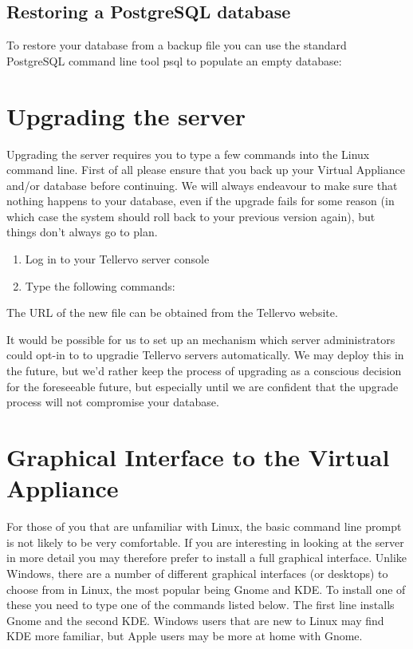 \subsection{Restoring a PostgreSQL database}
To restore your database from a backup file you can use the standard PostgreSQL command line tool psql to populate an empty database:




\section{Upgrading the server}
Upgrading the server requires you to type a few commands into the Linux command line.  First of all please ensure that you back up your Virtual Appliance and/or database before continuing.  We will always endeavour to make sure that nothing happens to your database, even if the upgrade fails for some reason (in which case the system should roll back to your previous version again), but things don't always go to plan.

\begin{enumerate}
 \item Log in to your Tellervo server console 
 \item Type the following commands: 
\end{enumerate}

The URL of the new file can be obtained from the Tellervo website.  

It would be possible for us to set up an mechanism which server administrators could opt-in to to upgradie Tellervo servers automatically.  We may deploy this in the future, but we'd rather keep the process of upgrading as a conscious decision for the foreseeable future, but especially until we are confident that the upgrade process will not compromise your database.


\section{Graphical Interface to the Virtual Appliance}
For those of you that are unfamiliar with Linux, the basic command line prompt is not likely to be very comfortable.  If you are interesting in looking at the server in more detail you may therefore prefer to install a full graphical interface.  Unlike Windows, there are a number of different graphical interfaces (or desktops) to choose from in Linux, the most popular being Gnome and KDE.  To install one of these you need to type one of the commands listed below.  The first line installs Gnome and the second KDE. Windows users that are new to Linux may find KDE more familiar, but Apple users may be more at home with Gnome.

